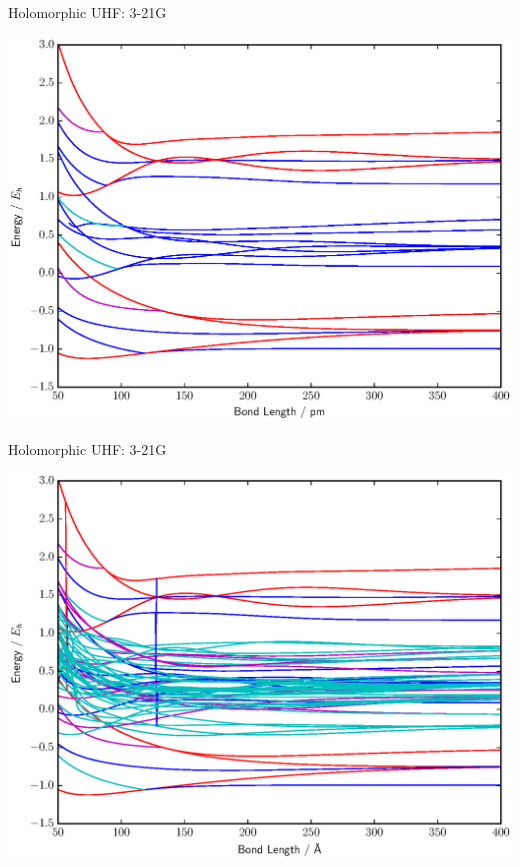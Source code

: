 \documentclass{beamer}
\begin{document}
\begin{frame}{Holomorphic UHF:  3-21G}
\vspace{-0.9em}
  \begin{center}
    \includegraphics[scale=0.45]{20161219_ThomGroup_Update/BFGS_stand_UHF_HH_3-21g}
  \end{center}
\end{frame}

\begin{frame}{Holomorphic UHF:  3-21G}
\vspace{-0.9em}
  \begin{center}
    \includegraphics[scale=0.45]{20161219_ThomGroup_Update/BFGS_UHF_HH_3-21g}
  \end{center}
\end{frame}
\end{document}
